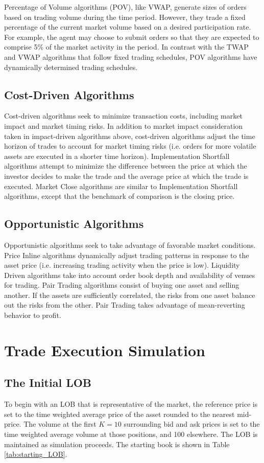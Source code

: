 Percentage of Volume algorithms (POV), like VWAP, generate sizes of orders based on trading volume during the time period. However, they trade a fixed percentage of the current market volume based on a desired participation rate. For example, the agent may choose to submit orders so that they are expected to comprise 5\% of the market activity in the period. In contrast with the TWAP and VWAP algorithms that follow fixed trading schedules, POV algorithms have dynamically determined trading schedules.

\subsection{Cost-Driven Algorithms}
Cost-driven algorithms seek to minimize transaction costs, including market impact and market timing risks. In addition to market impact consideration taken in impact-driven algorithms above, cost-driven algorithms adjust the time horizon of trades to account for market timing risks (i.e. orders for more volatile assets are executed in a shorter time horizon). Implementation Shortfall algorithms attempt to minimize the difference between the price at which the investor decides to make the trade and the average price at which the trade is executed. Market Close algorithms are similar to Implementation Shortfall algorithms, except that the benchmark of comparison is the closing price.

\subsection{Opportunistic Algorithms}
Opportunistic algorithms seek to take advantage of favorable market conditions. Price Inline algorithms dynamically adjust trading patterns in response to the asset price (i.e. increasing trading activity when the price is low). Liquidity Driven algorithms take into account order book depth and availability of venues for trading. Pair Trading algorithms consist of buying one asset and selling another. If the assets are sufficiently correlated, the risks from one asset balance out the risks from the other. Pair Trading takes advantage of mean-reverting behavior to profit.


\section{Trade Execution Simulation} \label{ch:sim_results}
\subsection{The Initial LOB}
To begin with an LOB that is representative of the market, the reference price is set to the time weighted average price of the asset rounded to the nearest mid-price. The volume at the first $K=10$ surrounding bid and ask prices is set to the time weighted average volume at those positions, and 100 elsewhere. The LOB is maintained as simulation proceeds. The starting book is shown in Table \ref{tab:starting_LOB}.

